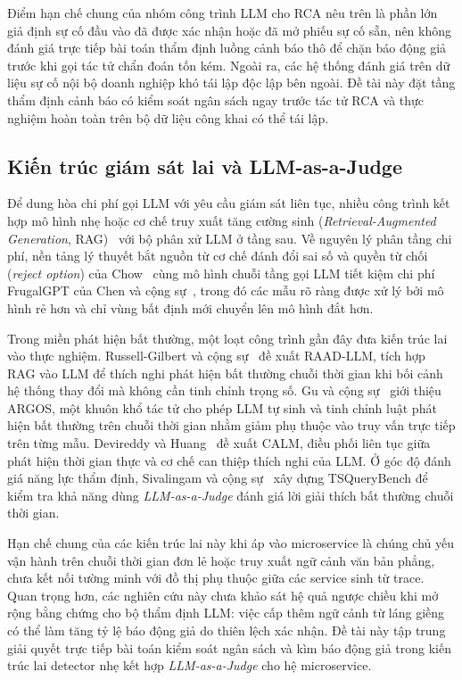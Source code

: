 Điểm hạn chế chung của nhóm công trình LLM cho RCA nêu trên là phần lớn giả định sự cố đầu vào đã được xác nhận hoặc đã mở phiếu sự cố sẵn, nên không đánh giá trực tiếp bài toán thẩm định luồng cảnh báo thô để chặn báo động giả trước khi gọi tác tử chẩn đoán tốn kém. Ngoài ra, các hệ thống đánh giá trên dữ liệu sự cố nội bộ doanh nghiệp khó tái lập độc lập bên ngoài. Đề tài này đặt tầng thẩm định cảnh báo có kiểm soát ngân sách ngay trước tác tử RCA và thực nghiệm hoàn toàn trên bộ dữ liệu công khai có thể tái lập.

\subsection{Kiến trúc giám sát lai và LLM-as-a-Judge}
\label{sec:ch3-hybrid-judge}

Để dung hòa chi phí gọi LLM với yêu cầu giám sát liên tục, nhiều công trình kết hợp mô hình nhẹ hoặc cơ chế truy xuất tăng cường sinh (\emph{Retrieval-Augmented Generation}, RAG)~\cite{lewis2020rag} với bộ phân xử LLM ở tầng sau. Về nguyên lý phân tầng chi phí, nền tảng lý thuyết bắt nguồn từ cơ chế đánh đổi sai số và quyền từ chối (\emph{reject option}) của Chow~\cite{chow1970reject} cùng mô hình chuỗi tầng gọi LLM tiết kiệm chi phí FrugalGPT của Chen và cộng sự~\cite{chen2024frugalgpt}, trong đó các mẫu rõ ràng được xử lý bởi mô hình rẻ hơn và chỉ vùng bất định mới chuyển lên mô hình đắt hơn.

Trong miền phát hiện bất thường, một loạt công trình gần đây đưa kiến trúc lai vào thực nghiệm. Russell-Gilbert và cộng sự~\cite{russellgilbert2025raad} đề xuất RAAD-LLM, tích hợp RAG vào LLM để thích nghi phát hiện bất thường chuỗi thời gian khi bối cảnh hệ thống thay đổi mà không cần tinh chỉnh trọng số. Gu và cộng sự~\cite{gu2025argos} giới thiệu ARGOS, một khuôn khổ tác tử cho phép LLM tự sinh và tinh chỉnh luật phát hiện bất thường trên chuỗi thời gian nhằm giảm phụ thuộc vào truy vấn trực tiếp trên từng mẫu. Devireddy và Huang~\cite{devireddy2025calm} đề xuất CALM, điều phối liên tục giữa phát hiện thời gian thực và cơ chế can thiệp thích nghi của LLM. Ở góc độ đánh giá năng lực thẩm định, Sivalingam và cộng sự~\cite{sivalingam2026tsquery} xây dựng TSQueryBench để kiểm tra khả năng dùng \emph{LLM-as-a-Judge} đánh giá lời giải thích bất thường chuỗi thời gian.

Hạn chế chung của các kiến trúc lai này khi áp vào microservice là chúng chủ yếu vận hành trên chuỗi thời gian đơn lẻ hoặc truy xuất ngữ cảnh văn bản phẳng, chưa kết nối tường minh với đồ thị phụ thuộc giữa các service sinh từ trace. Quan trọng hơn, các nghiên cứu này chưa khảo sát hệ quả ngược chiều khi mở rộng bằng chứng cho bộ thẩm định LLM: việc cấp thêm ngữ cảnh từ láng giềng có thể làm tăng tỷ lệ báo động giả do thiên lệch xác nhận. Đề tài này tập trung giải quyết trực tiếp bài toán kiểm soát ngân sách và kìm báo động giả trong kiến trúc lai detector nhẹ kết hợp \emph{LLM-as-a-Judge} cho hệ microservice.

